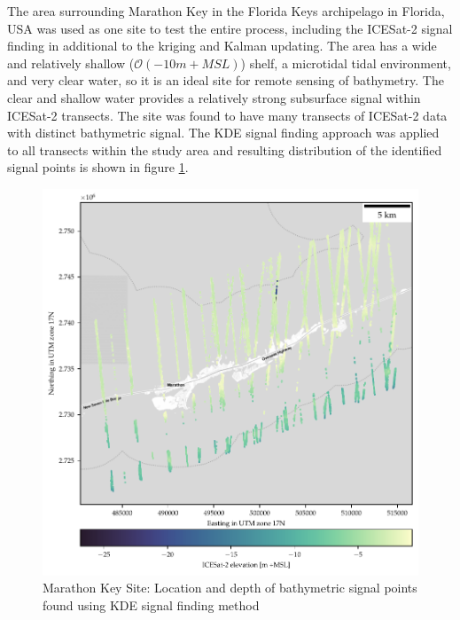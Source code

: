 The area surrounding Marathon Key in the Florida Keys archipelago in Florida, USA was used as one site to test the entire process, including the ICESat-2 signal finding in additional to the kriging and Kalman updating. The area has a wide and relatively shallow ($\mathcal{O}(-10 m +MSL)$) shelf, a microtidal tidal environment, and very clear water, so it is an ideal site for remote sensing of bathymetry. The clear and shallow water provides a relatively strong subsurface signal within ICESat-2 transects. The site was found to have many transects of ICESat-2 data with distinct bathymetric signal. The KDE signal finding approach was applied to all transects within the study area and resulting distribution of the identified signal points is shown in figure \ref{fig:keys-photons}.

\begin{figure}[h]
    \centering
    \includegraphics{figures/florida_keys_photon_map.pdf}
    \caption{Marathon Key Site: Location and depth of bathymetric signal points found using KDE signal finding method}
    \label{fig:keys-photons}
\end{figure}

